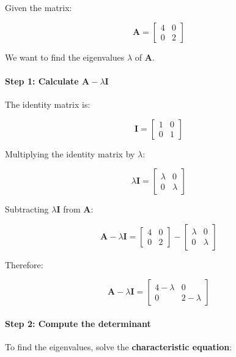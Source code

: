 \documentclass[11pt]{article}
\begin{document}
Given the matrix:

\[
\mathbf{A} =
\begin{bmatrix}
4 & 0 \\
0 & 2
\end{bmatrix}
\]

We want to find the eigenvalues \(\lambda\) of \(\mathbf{A}\).

\paragraph{\texorpdfstring{Step 1: Calculate
\(\mathbf{A} - \lambda \mathbf{I}\)}{Step 1: Calculate \textbackslash mathbf\{A\} - \textbackslash lambda \textbackslash mathbf\{I\}}}\label{step-1-calculate-mathbfa---lambda-mathbfi}

The identity matrix is:

\[
\mathbf{I} =
\begin{bmatrix}
1 & 0 \\
0 & 1
\end{bmatrix}
\]

Multiplying the identity matrix by \(\lambda\):

\[
\lambda \mathbf{I} =
\begin{bmatrix}
\lambda & 0 \\
0 & \lambda
\end{bmatrix}
\]

Subtracting \(\lambda \mathbf{I}\) from \(\mathbf{A}\):

\[
\mathbf{A} - \lambda \mathbf{I}
=
\begin{bmatrix}
4 & 0 \\
0 & 2
\end{bmatrix}
-
\begin{bmatrix}
\lambda & 0 \\
0 & \lambda
\end{bmatrix}
\]

Therefore:

\[
\boxed{
\mathbf{A} - \lambda \mathbf{I}
=
\begin{bmatrix}
4-\lambda & 0 \\
0 & 2-\lambda
\end{bmatrix}
}
\]

\paragraph{Step 2: Compute the
determinant}\label{step-2-compute-the-determinant}

To find the eigenvalues, solve the \textbf{characteristic equation}:
\end{document}

